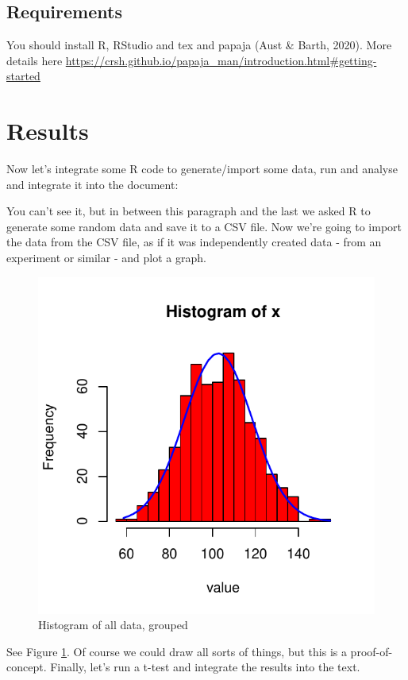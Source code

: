 \documentclass[
  english,
  ,jou,floatsintext]{apa6}
\begin{document}
\hypertarget{requirements}{%
\subsection{Requirements}\label{requirements}}

You should install R, RStudio and tex and papaja (Aust \& Barth, 2020). More details here \url{https://crsh.github.io/papaja_man/introduction.html\#getting-started}

\hypertarget{results}{%
\section{Results}\label{results}}

Now let's integrate some R code to generate/import some data, run and analyse and integrate it into the document:

You can't see it, but in between this paragraph and the last we asked R to generate some random data and save it to a CSV file. Now we're going to import the data from the CSV file, as if it was independently created data - from an experiment or similar - and plot a graph.

\begin{figure}

{\centering \includegraphics[width=0.75\linewidth]{example_manuscript_files/figure-latex/ourhistogram-1} 

}

\caption{Histogram of all data, grouped}\label{fig:ourhistogram}
\end{figure}

See Figure \ref{fig:ourhistogram}. Of course we could draw all sorts of things, but this is a proof-of-concept. Finally, let's run a t-test and integrate the results into the text.
\end{document}
